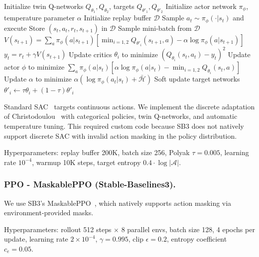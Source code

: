 \documentclass[letterpaper]{article}
\begin{document}
\begin{algorithm}[htbp]
\caption{Discrete Soft Actor-Critic (SAC)}
\label{alg:sac}
\begin{algorithmic}[1]
\State Initialize twin Q-networks $Q_{\theta_1}, Q_{\theta_2}$, targets $Q_{\theta'_1}, Q_{\theta'_2}$
\State Initialize actor network $\pi_\phi$, temperature parameter $\alpha$
\State Initialize replay buffer $\mathcal{D}$
    \State Sample $a_t \sim \pi_\phi(\cdot | s_t)$ and execute
    \State Store $(s_t, a_t, r_t, s_{t+1})$ in $\mathcal{D}$
    \State Sample mini-batch from $\mathcal{D}$
    \State $V(s_{t+1}) = \sum_a \pi_\phi(a|s_{t+1}) [\min_{i=1,2} Q_{\theta'_i}(s_{t+1}, a) - \alpha \log \pi_\phi(a|s_{t+1})]$
    \State $y_t = r_t + \gamma V(s_{t+1})$
    \State Update critics $\theta_i$ to minimize $(Q_{\theta_i}(s_t, a_t) - y_t)^2$
    \State Update actor $\phi$ to minimize $\sum_a \pi_\phi(a|s_t) [\alpha \log \pi_\phi(a|s_t) - \min_{i=1,2} Q_{\theta_i}(s_t, a)]$
    \State Update $\alpha$ to minimize $\alpha (\log \pi_\phi(a_t|s_t) + \bar{\mathcal{H}})$
    \State Soft update target networks $\theta'_i \leftarrow \tau \theta_i + (1 - \tau) \theta'_i$
\EndFor
\end{algorithmic}
\end{algorithm}

Standard SAC~\cite{haarnoja2018soft} targets continuous actions. We implement the discrete adaptation of Christodoulou~\cite{christodoulou2019soft} with categorical policies, twin Q-networks, and automatic temperature tuning. This required custom code because SB3 does not natively support discrete SAC with invalid action masking in the policy distribution.

Hyperparameters: replay buffer 200K, batch size 256, Polyak $\tau=0.005$, learning rate $10^{-4}$, warmup 10K steps, target entropy $0.4 \cdot \log|\mathcal{A}|$.

\subsubsection{PPO - MaskablePPO (Stable-Baselines3).}

We use SB3's MaskablePPO~\cite{raffin2021stable}, which natively supports action masking via environment-provided masks.

Hyperparameters: rollout 512 steps $\times$ 8 parallel envs, batch size 128, 4 epochs per update, learning rate $2{\times}10^{-4}$, $\gamma{=}0.995$, clip $\epsilon=0.2$, entropy coefficient $c_e=0.05$.
\end{document}
